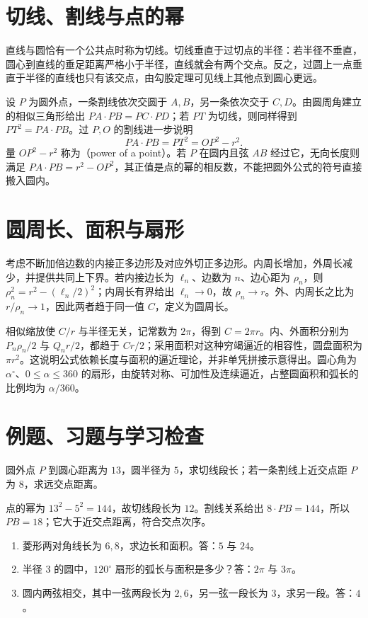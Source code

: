 \documentclass[UTF8]{ctexbook}
\begin{document}
\section{切线、割线与点的幂}
直线与圆恰有一个公共点时称为切线。切线垂直于过切点的半径：若半径不垂直，圆心到直线的垂足距离严格小于半径，直线就会有两个交点。反之，过圆上一点垂直于半径的直线也只有该交点，由勾股定理可见线上其他点到圆心更远。

设 $P$ 为圆外点，一条割线依次交圆于 $A,B$，另一条依次交于 $C,D$。由圆周角建立的相似三角形给出 $PA\cdot PB=PC\cdot PD$；若 $PT$ 为切线，则同样得到 $PT^2=PA\cdot PB$。过 $P,O$ 的割线进一步说明
\[
 PA\cdot PB=PT^2=OP^2-r^2.
\]
量 $OP^2-r^2$ 称为（power of a point）。若 $P$ 在圆内且弦 $AB$ 经过它，无向长度则满足 $PA\cdot PB=r^2-OP^2$，其正值是点的幂的相反数，不能把圆外公式的符号直接搬入圆内。

\section{圆周长、面积与扇形}
考虑不断加倍边数的内接正多边形及对应外切正多边形。内周长增加，外周长减少，并提供共同上下界。若内接边长为 $\ell_n$、边数为 $n$、边心距为 $\rho_n$，则 $\rho_n^2=r^2-(\ell_n/2)^2$；内周长有界给出 $\ell_n\to0$，故 $\rho_n\to r$。外、内周长之比为 $r/\rho_n\to1$，因此两者趋于同一值 $C$，定义为圆周长。

相似缩放使 $C/r$ 与半径无关，记常数为 $2\pi$，得到 $C=2\pi r$。内、外面积分别为 $P_n\rho_n/2$ 与 $Q_nr/2$，都趋于 $Cr/2$；采用面积对这种穷竭逼近的相容性，圆盘面积为 $\pi r^2$。这说明公式依赖长度与面积的逼近理论，并非单凭拼接示意得出。圆心角为 $\alpha^\circ$、$0\le\alpha\le360$ 的扇形，由旋转对称、可加性及连续逼近，占整圆面积和弧长的比例均为 $\alpha/360$。

\section{例题、习题与学习检查}
\begin{example}
圆外点 $P$ 到圆心距离为 $13$，圆半径为 $5$，求切线段长；若一条割线上近交点距 $P$ 为 $8$，求远交点距离。
\end{example}
\begin{solve}
点的幂为 $13^2-5^2=144$，故切线段长为 $12$。割线关系给出 $8\cdot PB=144$，所以 $PB=18$；它大于近交点距离，符合交点次序。
\end{solve}
\begin{enumerate}
\item 菱形两对角线长为 $6,8$，求边长和面积。答：$5$ 与 $24$。
\item 半径 $3$ 的圆中，$120^\circ$ 扇形的弧长与面积是多少？答：$2\pi$ 与 $3\pi$。
\item 圆内两弦相交，其中一弦两段长为 $2,6$，另一弦一段长为 $3$，求另一段。答：$4$。
\end{enumerate}
\end{document}
